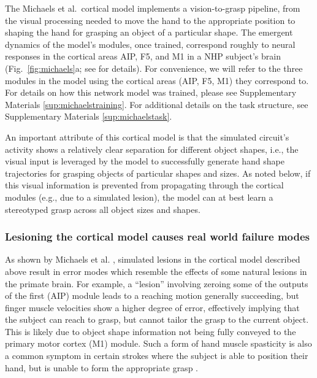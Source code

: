 \documentclass[12pt]{iopart}
\begin{document}
The Michaels et al.\ cortical model implements a vision-to-grasp pipeline, from the visual
processing needed to move the hand to the appropriate position to shaping the hand for
grasping an object of a particular shape. The emergent dynamics of the model's modules, once trained,
correspond roughly to neural responses in the cortical areas AIP, F5, and M1 in a NHP subject's brain (Fig.~\ref{fig:michaels}a;
see \cite{michaels.mrnn} for details). For convenience, we will refer to the three
modules in the model using the cortical areas (AIP, F5, M1) they correspond to. For details on how this network model 
was trained, please see Supplementary Materials \ref{sup:michaelstraining}. For additional details on the task structure, see
Supplementary Materials \ref{sup:michaelstask}.

An important attribute of this cortical model is that  the simulated circuit's activity shows a relatively
clear separation for different object shapes, i.e., the  visual input is leveraged by the model to
successfully generate hand shape trajectories for grasping objects of particular shapes and sizes. As noted
below, if this visual information is prevented from propagating through the cortical modules (e.g., due to a
simulated lesion), the model can at best learn a stereotyped grasp across all object sizes and shapes. 

\subsubsection{Lesioning the cortical model causes real world failure modes}
As shown by Michaels et al. \cite{michaels.mrnn}, simulated lesions in the cortical model described
above result in error modes which resemble the effects of some natural lesions in the primate brain.
For example, a ``lesion'' involving zeroing some of the outputs of the first (AIP) module 
leads to a reaching motion generally succeeding, but finger muscle velocities show a higher
degree of error, effectively implying that the subject can reach to grasp, but cannot
tailor the grasp to the current object. This is likely due to object shape information not
being fully conveyed to the primary motor cortex (M1) module. Such a form of hand muscle spasticity
is also a common symptom in certain strokes where the subject is able to position their
hand, but is unable to form the appropriate grasp \cite{khanna.openloop, puthenveettil.hand}. 
\end{document}
